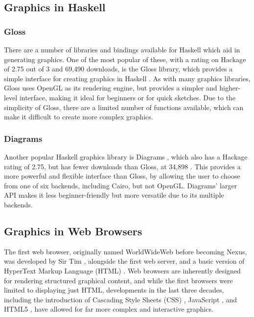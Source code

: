 \documentclass[../main.tex]{subfiles}
\begin{document}
        \subsection{Graphics in Haskell}
            \subsubsection{Gloss}
                There are a number of libraries and bindings available for Haskell which aid in
                    generating graphics.
                One of the most popular of these, with a rating on Hackage of 2.75 out of 3 and
                    69,490 downloads, is the Gloss library, which provides a simple interface for
                    creating graphics in Haskell \citep{hackageGloss}.
                As with many graphics libraries, Gloss uses OpenGL as its rendering engine, but
                    provides a simpler and higher-level interface, making it ideal for beginners or
                    for quick sketches.
                Due to the simplicity of Gloss, there are a limited number of functions
                    available, which can make it difficult to create more complex graphics.

            \subsubsection{Diagrams}
                Another popular Haskell graphics library is Diagrams \citep{hackageDiagrams},
                    which also has a Hackage rating of 2.75, but has fewer downloads than Gloss, at
                    34,898 \citep{hackageDiagrams}.
                This provides a more powerful and flexible interface than Gloss, by allowing
                    the user to choose from one of six backends, including Cairo, but not OpenGL.
                Diagrams' larger API makes it less beginner-friendly but more versatile due to
                    its multiple backends.

        \subsection{Graphics in Web Browsers}
            The first web browser, originally named WorldWideWeb before becoming Nexus, was
                developed by Sir Tim \citet{worldWideWeb}, alongside the first web server, and
                a basic version of HyperText Markup Language (HTML) \citep{html}.
            Web browsers are inherently designed for rendering structured graphical
                content, and while the first browsers were limited to displaying just HTML,
                developments in the last three decades, including the introduction of Cascading
                Style Sheets (CSS) \citep{css}, JavaScript \citep{js}, and HTML5 \citep{html5},
                have allowed for far more complex and interactive graphics.
\end{document}
